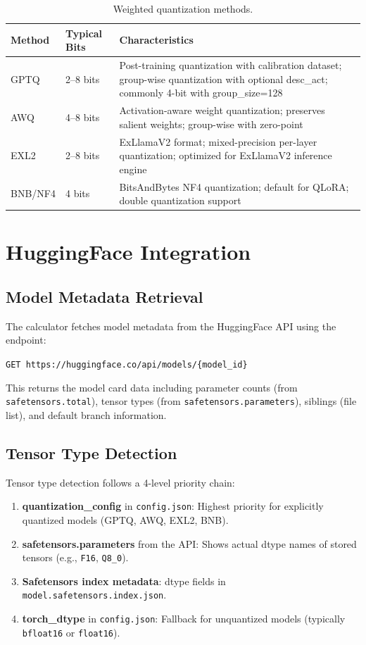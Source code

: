 \documentclass[11pt,a4paper]{article}
\theoremstyle{definition}
\begin{document}
\begin{table}[htbp]
\centering
\caption{Weighted quantization methods.}\label{tab:wquant}
\begin{tabularx}{0.9\textwidth}{llX}
\toprule
\textbf{Method} & \textbf{Typical Bits} & \textbf{Characteristics} \\
\midrule
GPTQ & 2--8 bits & Post-training quantization with calibration dataset; group-wise quantization with optional desc\_act; commonly 4-bit with group\_size=128 \\
AWQ & 4--8 bits & Activation-aware weight quantization; preserves salient weights; group-wise with zero-point \\
EXL2 & 2--8 bits & ExLlamaV2 format; mixed-precision per-layer quantization; optimized for ExLlamaV2 inference engine \\
BNB/NF4 & 4 bits & BitsAndBytes NF4 quantization; default for QLoRA; double quantization support \\
\bottomrule
\end{tabularx}
\end{table}

\section{HuggingFace Integration}

\subsection{Model Metadata Retrieval}

The calculator fetches model metadata from the HuggingFace API using the endpoint:

\begin{formulabox}
\small\texttt{GET https://huggingface.co/api/models/\{model\_id\}}
\end{formulabox}

This returns the model card data including parameter counts (from \texttt{safetensors.total}), tensor types (from \texttt{safetensors.parameters}), siblings (file list), and default branch information.

\subsection{Tensor Type Detection}

Tensor type detection follows a 4-level priority chain:

\begin{enumerate}
  \item \textbf{quantization\_config} in \texttt{config.json}: Highest priority for explicitly quantized models (GPTQ, AWQ, EXL2, BNB).
  \item \textbf{safetensors.parameters} from the API: Shows actual dtype names of stored tensors (e.g., \texttt{F16}, \texttt{Q8\_0}).
  \item \textbf{Safetensors index metadata}: dtype fields in \texttt{model.safetensors.index.json}.
  \item \textbf{torch\_dtype} in \texttt{config.json}: Fallback for unquantized models (typically \texttt{bfloat16} or \texttt{float16}).
\end{enumerate}
\end{document}
